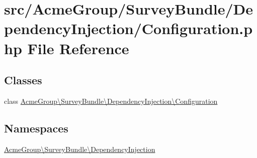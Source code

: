 \hypertarget{_survey_bundle_2_dependency_injection_2_configuration_8php}{\section{src/\+Acme\+Group/\+Survey\+Bundle/\+Dependency\+Injection/\+Configuration.php File Reference}
\label{_survey_bundle_2_dependency_injection_2_configuration_8php}
}
\subsection*{Classes}
\begin{DoxyCompactItemize}
\item 
class \hyperlink{class_acme_group_1_1_survey_bundle_1_1_dependency_injection_1_1_configuration}{Acme\+Group\textbackslash{}\+Survey\+Bundle\textbackslash{}\+Dependency\+Injection\textbackslash{}\+Configuration}
\end{DoxyCompactItemize}
\subsection*{Namespaces}
\begin{DoxyCompactItemize}
\item 
 \hyperlink{namespace_acme_group_1_1_survey_bundle_1_1_dependency_injection}{Acme\+Group\textbackslash{}\+Survey\+Bundle\textbackslash{}\+Dependency\+Injection}
\end{DoxyCompactItemize}
